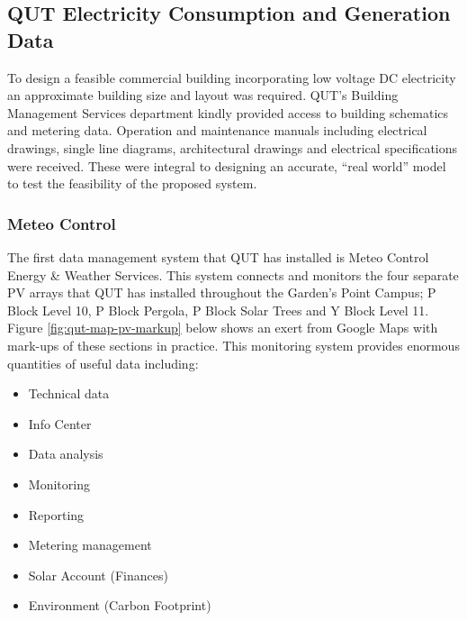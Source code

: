
\subsection{QUT Electricity Consumption and Generation Data} \label{section:QUT-Data}

To design a feasible commercial building incorporating low voltage DC electricity an approximate building size and layout was required. QUT's Building Management Services department kindly provided access to building schematics and metering data. Operation and maintenance manuals including electrical drawings, single line diagrams, architectural drawings and electrical specifications were received. These were integral to designing an accurate, ``real world'' model to test the feasibility of the proposed system.

\subsubsection{Meteo Control}

The first data management system that QUT has installed is Meteo Control Energy \& Weather Services. This system connects and monitors the four separate PV arrays that QUT has installed throughout the Garden's Point Campus; P Block Level 10, P Block Pergola, P Block Solar Trees and Y Block Level 11. Figure \ref{fig:qut-map-pv-markup} below shows an exert from Google Maps with mark-ups of these sections in practice. This monitoring system provides enormous quantities of useful data including: 

\begin{itemize}[noitemsep,nolistsep]
	\item Technical data 
	\item Info Center
	\item Data analysis
	\item Monitoring
	\item Reporting
	\item Metering management
	\item Solar Account (Finances)
	\item Environment (Carbon Footprint)
\end{itemize} 

